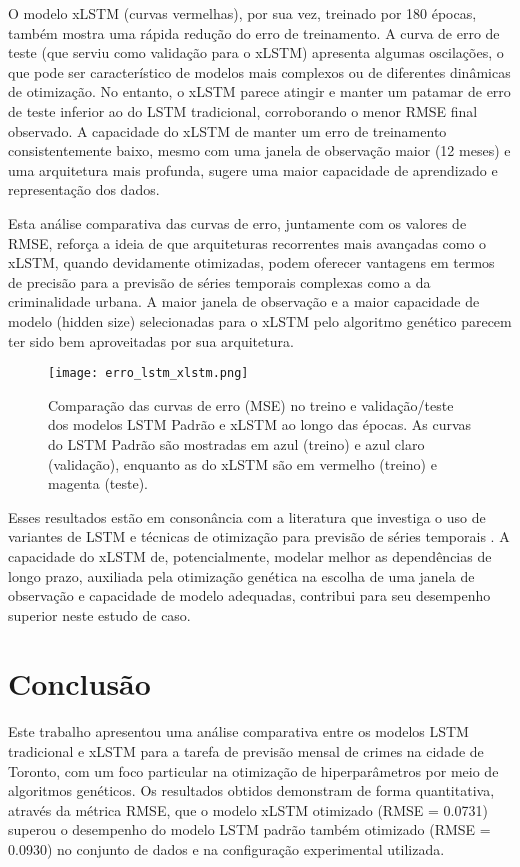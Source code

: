 \documentclass[conference]{IEEEtran}
\begin{document}
O modelo xLSTM (curvas vermelhas), por sua vez, treinado por 180 épocas, também mostra uma rápida redução do erro de treinamento. A curva de erro de teste (que serviu como validação para o xLSTM) apresenta algumas oscilações, o que pode ser característico de modelos mais complexos ou de diferentes dinâmicas de otimização. No entanto, o xLSTM parece atingir e manter um patamar de erro de teste inferior ao do LSTM tradicional, corroborando o menor RMSE final observado. A capacidade do xLSTM de manter um erro de treinamento consistentemente baixo, mesmo com uma janela de observação maior (12 meses) e uma arquitetura mais profunda, sugere uma maior capacidade de aprendizado e representação dos dados.

Esta análise comparativa das curvas de erro, juntamente com os valores de RMSE, reforça a ideia de que arquiteturas recorrentes mais avançadas como o xLSTM, quando devidamente otimizadas, podem oferecer vantagens em termos de precisão para a previsão de séries temporais complexas como a da criminalidade urbana. A maior janela de observação e a maior capacidade de modelo (hidden size) selecionadas para o xLSTM pelo algoritmo genético parecem ter sido bem aproveitadas por sua arquitetura.

\begin{figure}[htbp]
\centerline{\texttt{[image: erro\_lstm\_xlstm.png]}}
\caption{Comparação das curvas de erro (MSE) no treino e validação/teste dos modelos LSTM Padrão e xLSTM ao longo das épocas. As curvas do LSTM Padrão são mostradas em azul (treino) e azul claro (validação), enquanto as do xLSTM são em vermelho (treino) e magenta (teste).}
\label{fig:erro_lstm_xlstm}
\end{figure}

Esses resultados estão em consonância com a literatura que investiga o uso de variantes de LSTM e técnicas de otimização para previsão de séries temporais \cite{b5, b6}. A capacidade do xLSTM de, potencialmente, modelar melhor as dependências de longo prazo, auxiliada pela otimização genética na escolha de uma janela de observação e capacidade de modelo adequadas, contribui para seu desempenho superior neste estudo de caso.

\section{Conclusão}
\label{sec:conclusao}
Este trabalho apresentou uma análise comparativa entre os modelos LSTM tradicional e xLSTM para a tarefa de previsão mensal de crimes na cidade de Toronto, com um foco particular na otimização de hiperparâmetros por meio de algoritmos genéticos. Os resultados obtidos demonstram de forma quantitativa, através da métrica RMSE, que o modelo xLSTM otimizado (RMSE = 0.0731) superou o desempenho do modelo LSTM padrão também otimizado (RMSE = 0.0930) no conjunto de dados e na configuração experimental utilizada.
\end{document}
